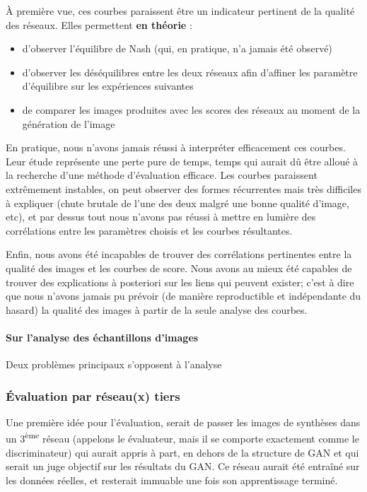 À première vue, ces courbes paraissent être un indicateur pertinent de la qualité des réseaux. Elles permettent \textbf{en théorie} :
\begin{itemize}
  \item d'observer l'équilibre de Nash (qui, en pratique, n'a jamais été observé)
  \item d'observer les déséquilibres entre les deux réseaux afin d'affiner les paramètre d'équilibre sur les expériences suivantes
  \item de comparer les images produites avec les scores des réseaux au moment de la génération de l'image
\end{itemize}

En pratique, nous n'avons jamais réussi à interpréter efficacement ces courbes. Leur étude représente une perte pure de temps, temps qui aurait dû être alloué à la recherche d'une méthode d'évaluation efficace. Les courbes paraissent extrêmement instables, on peut observer des formes récurrentes mais très difficiles à expliquer (chute brutale de l'une des deux malgré une bonne qualité d'image, etc), et par dessus tout nous n'avons pas réussi à mettre en lumière des corrélations entre les paramètres choisis et les courbes résultantes.

Enfin, nous avons été incapables de trouver des corrélations pertinentes entre la qualité des images et les courbes de score. Nous avons au mieux été capables de trouver des explications à posteriori sur les liens qui peuvent exister; c'est à dire que nous n'avons jamais pu prévoir (de manière reproductible et indépendante du hasard) la qualité des images à partir de la seule analyse des courbes.

\paragraph{Sur l'analyse des échantillons d'images}

Deux problèmes principaux s'opposent à l'analyse 

\subsubsection{Évaluation par réseau(x) tiers}

Une première idée pour l'évaluation, serait de passer les images de synthèses dans un 3\textsuperscript{ème} réseau (appelons le évaluateur, mais il se comporte exactement comme le discriminateur) qui aurait appris à part, en dehors de la structure de GAN et qui serait un juge objectif sur les résultats du GAN. Ce réseau aurait été entraîné sur les données réelles, et resterait immuable une fois son apprentissage terminé. 

